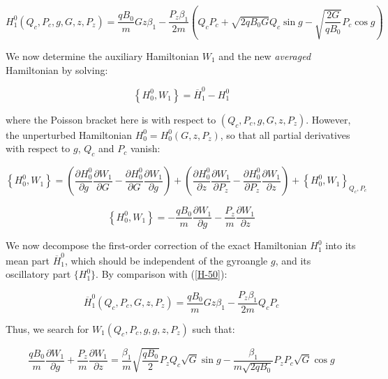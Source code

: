 \begin{equation}
    \label{H-50}
    H_1^0(Q_c,P_c,g,G,z,P_z)=\frac{qB_0}{m}Gz\beta_1-\frac{P_z\beta_1}{2m}\left(Q_cP_c+\sqrt{2qB_0G}Q_c\sin{g}-\sqrt{\frac{2G}{qB_0}}P_c\cos{g}\right)
\end{equation} 

We now determine the auxiliary Hamiltonian $W_1$ and the new \textit{averaged} Hamiltonian by solving:

\begin{equation*}
    \left\{H_0^0,W_1\right\}=\overline{H}_1^0-H_1^0
\end{equation*}

where the Poisson bracket here is with respect to $(Q_c,P_c,g,G,z,P_z)$. However, the unperturbed Hamiltonian $H_0^0=H_0^0(G,z,P_z)$, so that all partial derivatives with respect to $g$, $Q_c$ and $P_c$ vanish: 

\begin{equation*}
    \left\{H_0^0,W_1\right\}=\left(\frac{\partial H_0^0}{\partial g}\frac{\partial W_1}{\partial G}-\frac{\partial H_0^0}{\partial G}\frac{\partial W_1}{\partial g}\right)+\left(\frac{\partial H_0^0}{\partial z}\frac{\partial W_1}{\partial P_z}-\frac{\partial H_0^0}{\partial P_z}\frac{\partial W_1}{\partial z}\right)+\left\{H_0^0, W_1\right\}_{Q_c, P_c}
\end{equation*}

\begin{equation}
    \label{H-51}
    \left\{H_0^0,W_1\right\}=-\frac{qB_0}{m}\frac{\partial W_1}{\partial g}-\frac{P_z}{m}\frac{\partial W_1}{\partial z}
\end{equation}

We now decompose the first-order correction of the exact Hamiltonian $H_1^0$ into its mean part $\overline{H}_1^0$, which should be independent of the gyroangle $g$, and its oscillatory part $\{H_1^0\}$. By comparison with (\ref{H-50}):

\begin{equation*}
    \overline{H}_1^0(Q_c,P_c,G,z,P_z)=\frac{qB_0}{m}Gz\beta_1-\frac{P_z\beta_1}{2m}Q_cP_c
\end{equation*}

Thus, we search for $W_1(Q_c,P_c,g,g,z,P_z)$ such that:

\begin{equation*}
    \frac{qB_0}{m}\frac{\partial W_1}{\partial g}+\frac{P_z}{m}\frac{\partial W_1}{\partial z}=\frac{\beta_1}{m}\sqrt{\frac{qB_0}{2}}P_zQ_c\sqrt{G}\sin{g}-\frac{\beta_1}{m\sqrt{2qB_0}}P_zP_c\sqrt{G}\cos{g}
\end{equation*}

